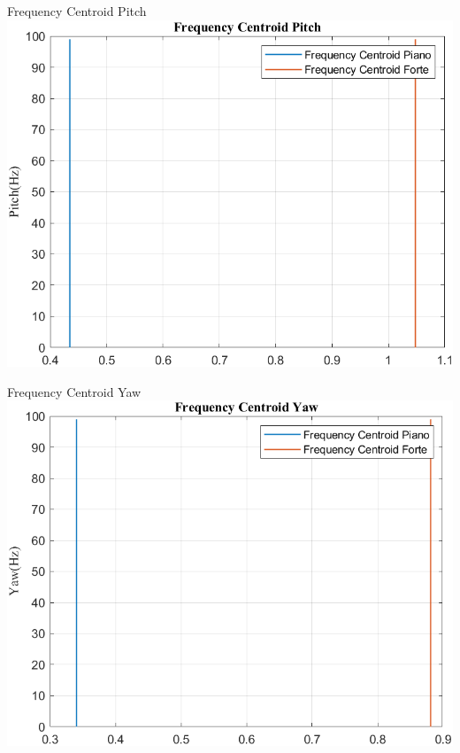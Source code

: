 	\begin{frame}{{Frequency Centroid Pitch}}
		\centering\includegraphics[height=.8\textheight]{figure/VAng/Trasformata/Frequency CentroidPitch}
	\end{frame}
	
	\begin{frame}{{Frequency Centroid Yaw}}
		\centering\includegraphics[height=.8\textheight]{figure/VAng/Trasformata/Frequency CentroidYaw}
	\end{frame}
	
